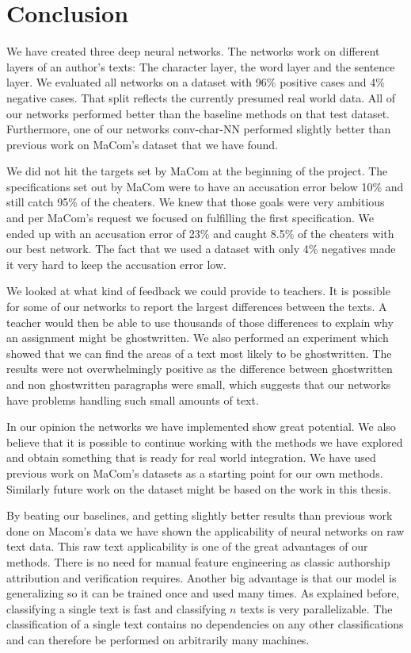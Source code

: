 \section{Conclusion} \label{sec:conclusion}

We have created three deep neural networks. The networks work on different
layers of an author's texts: The character layer, the word layer and the
sentence layer. We evaluated all networks on a dataset with 96\% positive cases
and 4\% negative cases. That split reflects the currently presumed real world
data. All of our networks performed better than the baseline methods on that
test dataset. Furthermore, one of our networks \gls{conv-char-NN} performed
slightly better than previous work on MaCom's dataset that we have found.

We did not hit the targets set by MaCom at the beginning of the project. The
specifications set out by MaCom were to have an accusation error below 10\% and
still catch 95\% of the cheaters. We knew that those goals were very ambitious
and per MaCom's request we focused on fulfilling the first specification. We
ended up with an accusation error of 23\% and caught 8.5\% of the cheaters with
our best network. The fact that we used a dataset with only 4\% negatives made
it very hard to keep the accusation error low.

We looked at what kind of feedback we could provide to teachers. It is possible
for some of our networks to report the largest differences between the texts.
A teacher would then be able to use thousands of those differences to explain
why an assignment might be ghostwritten. We also performed an experiment which
showed that we can find the areas of a text most likely to be ghostwritten. The
results were not overwhelmingly positive as the difference between ghostwritten
and non ghostwritten paragraphs were small, which suggests that our networks
have problems handling such small amounts of text.

In our opinion the networks we have implemented show great potential. We also
believe that it is possible to continue working with the methods we have
explored and obtain something that is ready for real world integration. We have
used previous work on MaCom's datasets as a starting point for our own methods.
Similarly future work on the dataset might be based on the work in this thesis.

By beating our baselines, and getting slightly better results than previous work
done on Macom's data we have shown the applicability of neural networks on raw
text data. This raw text applicability is one of the great advantages of our
methods. There is no need for manual feature engineering as classic authorship
attribution and verification requires. Another big advantage is that our model
is generalizing so it can be trained once and used many times. As explained
before, classifying a single text is fast and classifying $n$ texts is very
parallelizable. The classification of a single text contains no dependencies on
any other classifications and can therefore be performed on arbitrarily many
machines.

